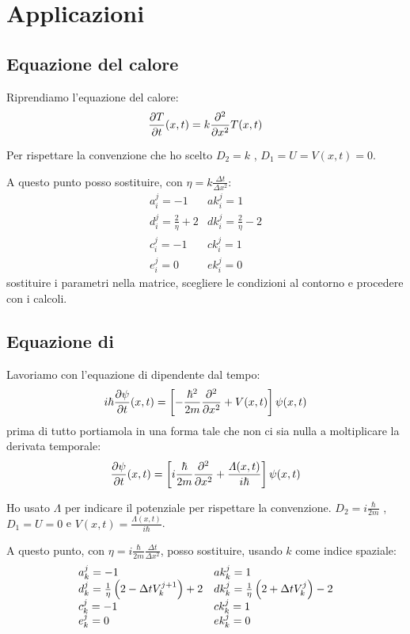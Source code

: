 \section{Applicazioni}
\subsection{Equazione del calore}
Riprendiamo l'equazione del calore:
\begin{equation}
  \frac{\partial T}{\partial t}(x,t) =k\frac{\partial ^2}{\partial x^2}T(x,t)
\end{equation}

Per rispettare la convenzione che ho scelto $D_2 = k$ , $D_1 = U = V(x,t) = 0$. 

A questo punto posso sostituire, con $\eta = k\frac{\Delta t}{\Delta x^2}$:
\begin{equation}\label{eq:pararametriHeat}
  \begin{array}{ll}
    a_i^j = -1            & ak_i^j =1\\
    d_i^j = \frac2\eta +2 & dk_i^j = \frac2\eta -2 \\
    c_i^j = -1             & ck_i^j =1\\
    e_i^j = 0             & ek_i^j =0
  \end{array}
\end{equation}
sostituire i parametri nella matrice, scegliere le condizioni al contorno e procedere con i calcoli.

\subsection{Equazione di \Schrodinger}
Lavoriamo con l'equazione di \Schrodinger  dipendente dal tempo:
\begin{equation}
  i\hbar\frac{\partial \psi}{\partial t}(x,t) =\left[ -\frac{\hbar^2}{2m}\frac{\partial ^2}{\partial x^2}+V(x,t) \right] \psi(x,t)
\end{equation}
prima di tutto portiamola in una forma tale che non ci sia nulla a moltiplicare la derivata temporale:
\begin{equation}
  \frac{\partial \psi}{\partial t}(x,t) =\left[ i\frac{\hbar}{2m}\frac{\partial ^2}{\partial x^2}+\frac{\varLambda(x,t)}{i\hbar} \right] {\psi(x,t)}
\end{equation} 

Ho usato $\varLambda$ per indicare il potenziale per rispettare la convenzione. $D_2 = i\frac{\hbar}{2m}$ , $D_1 = U = 0$ e $V(x,t) = \frac{\varLambda(x,t)}{i\hbar}$.

A questo punto, con $\eta = i\frac{\hbar}{2m}\frac{\Delta t}{\Delta x^2}$, posso sostituire, usando $k$ come indice spaziale:
\begin{equation}\label{eq:pararametriSC}
  \begin{array}{ll}
    a_k^j = -1            & ak_k^j =1\\
    d_k^j = \frac1\eta\left( 2-\Delta t V_k^{j+1} \right) +2 & dk_k^j = \frac1\eta\left( 2+\Delta tV_k^{j} \right) -2 \\
    c_k^j = -1             & ck_k^j =1\\
    e_k^j = 0             & ek_k^j =0
  \end{array}
\end{equation}
